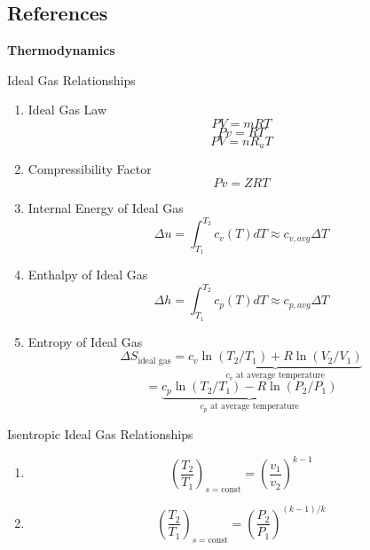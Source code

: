 \setlength{\columnsep}{0.1in}

\begin{center}\section*{References}\end{center}

\begin{multicols*}{2}[]

\textbf{Thermodynamics}

Ideal Gas Relationships
\vspace{-1em}
\begin{enumerate}
\item[] Ideal Gas Law \[PV=mRT \]\[ Pv = RT\]\[PV = nR_u T\]
\item[] Compressibility Factor \[Pv = ZRT\]
\item[] Internal Energy of Ideal Gas \[\Delta u = \int_{T_1}^{T_2} c_v(T)dT \approx c_{v,avg}\Delta T\]
\item[] Enthalpy of Ideal Gas \[\Delta h = \int_{T_1}^{T_2} c_p(T)dT \approx c_{p,avg}\Delta T\]
\item[] Entropy of Ideal Gas \[\Delta S_\text{ideal gas} = \underbrace{c_v \ln (T_2 / T_1) + R\ln (V_2 / V_1)}_{c_v\text{ at average temperature}}\]
\[=\underbrace{c_p\ln (T_2 / T_1) - R\ln (P_2 / P_1)}_{c_p\text{ at average temperature}}\]
\end{enumerate}
\vspace{-1em}
Isentropic Ideal Gas Relationships
\vspace{-1em}
\begin{enumerate}
\item[]\[\left(\frac{T_2}{T_1}\right)_{s=\text{const}} = \left(\frac{v_1}{v_2}\right)^{k-1}\]

\item[]\[\left(\frac{T_2}{T_1}\right)_{s=\text{const}} = \left(\frac{P_2}{P_1}\right)^{(k-1)/k}\]


\end{enumerate}
\end{multicols*}
